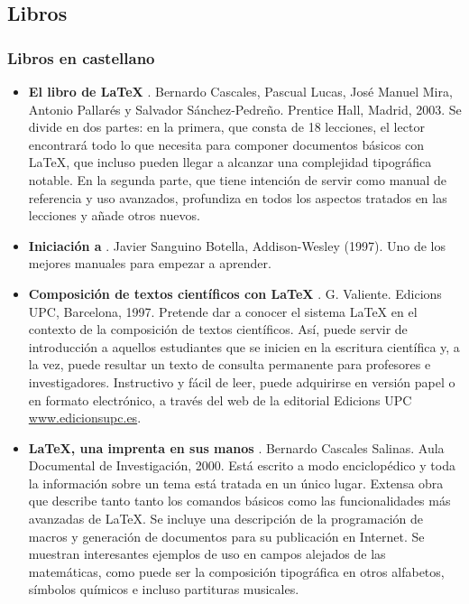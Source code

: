  								
 		\subsection{Libros}%
 						\subsubsection{Libros en castellano}
 															
								\begin{itemize}
											\item \textbf{El libro de \LaTeX{}} \cite{librolatex}. Bernardo Cascales, Pascual Lucas, Jos\'e 
											Manuel Mira, Antonio Pallar\'es y Salvador S\'anchez-Pedre\~no. Prentice Hall, Madrid, 2003.
											Se divide en dos partes: en la primera, que consta de 18 lecciones,  el lector encontrar\'a todo 
											lo que necesita para componer documentos b\'asicos con \LaTeX{}, que incluso pueden llegar a 
											alcanzar una complejidad tipogr\'afica notable. En la segunda parte, que tiene intenci\'on 
											de servir como manual de referencia y uso avanzados, profundiza en todos los aspectos tratados 
											en las lecciones y a\~nade otros nuevos.
											
											\item \textbf{Iniciaci\'on a \LaTeXe{}} \cite{botella}. Javier Sanguino Botella, Addison-Wesley (1997).
											Uno de los mejores manuales para empezar a aprender.
											
											\item \textbf{Composici\'on de textos cient\'ificos con \LaTeX{}} \cite{valiente}. G. Valiente. 
											Edicions UPC, Barcelona, 1997.
											Pretende dar a conocer el sistema \LaTeX{} en el contexto de la composici\'on de textos 
											cient\'ificos. As\'i, puede servir de introducci\'on a aquellos estudiantes que se inicien en 
											la escritura cient\'ifica y, a la vez, puede resultar un texto de consulta permanente para 
											profesores e investigadores. Instructivo y f\'acil de leer, puede adquirirse en versi\'on 
											papel o en formato electr\'onico, a trav\'es del web de la editorial Edicions 
											UPC \url{www.edicionsupc.es}.
											
											\item \textbf{\LaTeX{}, una imprenta en sus manos} \cite{imprenta}. Bernardo Cascales Salinas.
											Aula Documental de Investigaci\'on, 2000.
											Est\'a escrito a modo enciclop\'edico y toda la informaci\'on sobre un tema est\'a tratada en 
											un \'unico lugar. Extensa obra que describe tanto tanto los comandos b\'asicos como las 
											funcionalidades m\'as avanzadas de \LaTeX{}. Se incluye una descripci\'on de la programaci\'on 
											de macros y generaci\'on de documentos para su publicaci\'on en Internet. Se muestran
											interesantes ejemplos de uso en campos alejados de las matem\'aticas, como puede ser la
											composici\'on tipogr\'afica en otros alfabetos, s\'imbolos qu\'imicos e incluso partituras 
											musicales.
 
								\end{itemize}
								
